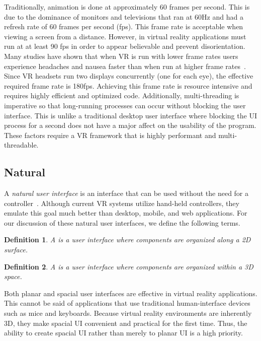 \documentclass[conference,12pt]{IEEEtran}
\newtheorem{definition}{Definition}
\begin{document}
Traditionally, animation is done at approximately 60 frames per second.  This is
due to the dominance of monitors and televisions that ran at 60Hz and had a
refresh rate of 60 frames per second (fps).  This frame rate is acceptable when
viewing a screen from a distance. However, in virtual reality applications must
run at at least 90 fps in order to appear believable and prevent disorientation.
Many studies have shown that when VR is run with lower frame rates users
experience headaches and nausea faster than when run at higher frame
rates~\cite{irisVR}. Since VR headsets run two displays concurrently (one for
each eye), the effective required frame rate is 180fps.  Achieving this frame
rate is resource intensive and requires highly efficient and optimized code.
Additionally, multi-threading is imperative so that long-running processes can
occur without blocking the user interface. This is unlike a traditional desktop
user interface where blocking the UI process for a second does not have a major
affect on the usability of the program. These factors require a VR framework
that is highly performant and multi-threadable.

\subsection{Natural}\label{sec:natural}

A \textit{natural user interface} is an interface that can be used without the
need for a controller~\cite{Wimmers:2015:VR:Natural-UI}. Although current VR
systems utilize hand-held controllers, they emulate this goal much better than
desktop, mobile, and web applications. For our discussion of these natural user
interfaces, we define the following terms.

\begin{definition}\label{def:planar-ui}
    A {\normalfont{}} is a user interface where components are
    organized along a 2D surface.
\end{definition}

\begin{definition}\label{def:spacial-ui}
    A {\normalfont{}} is a user interface where components are
    organized within a 3D space.
\end{definition}

Both planar and spacial user interfaces are effective in virtual reality
applications. This cannot be said of applications that use traditional
human-interface devices such as mice and keyboards. Because virtual reality
environments are inherently 3D, they make spacial UI convenient and practical
for the first time. Thus, the ability to create spacial UI rather than merely to
planar UI is a high priority.
\end{document}

